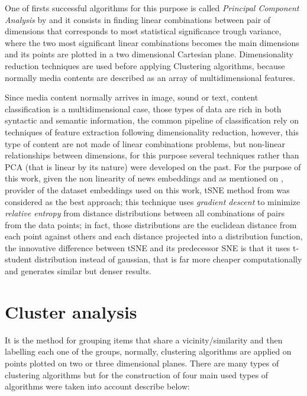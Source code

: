 \documentclass[ecp,tc,english]{iiufrgs}
\begin{document}
        One of firsts successful algorithms for this purpose is called \textit{Principal Component Analysis} 
        by \cite{hotelling1933} and it consists in finding linear combinations between pair of dimensions that corresponds to most statistical significance trough variance, where the two most significant linear combinations becomes the main dimensions and its points are plotted in a two dimensional Cartesian plane.
        Dimensionality reduction techniques are used before applying Clustering algorithms, because normally media contents are described as an array of multidimensional features.
        
        Since media content normally arrives in image, sound or text, content classification is a multidimensional case, those types of data are rich in both syntactic and semantic information, the common pipeline of classification rely on techniques of feature extraction following dimensionality reduction, however, this type of content are not made of linear combinations problems, but non-linear relationships between dimensions, for this purpose several techniques rather than PCA (that is linear by its nature) were developed on the past. For the purpose of this work, given the non linearity of news embeddings and as mentioned on \cite{moreira2018chameleon}, provider of the dataset embeddings used on this work, tSNE method from \cite{maaten2008} was considered as the best approach; this technique uses \textit{gradient descent} \cite{bryson1962} to minimize \textit{relative entropy} \cite{kullback1951} from distance distributions between all combinations of pairs from the data points; in fact, those distributions are the euclidean distance from each point against others and each distance projected into a distribution function, the innovative difference between tSNE and its predecessor SNE \cite{hinton2002} is that it uses t-student distribution instead of gaussian, that is far more cheaper computationally and generates similar but denser results.
        
        \section{Cluster analysis} \label{cluster_analysis}
        It is the method for grouping items that share a vicinity/similarity and then labelling each one of the groups, normally, clustering algorithms are applied on points plotted on two or three dimensional planes. There are many types of clustering algorithms but for the construction of four main used types of algorithms were taken into account describe below:
        
\end{document}
